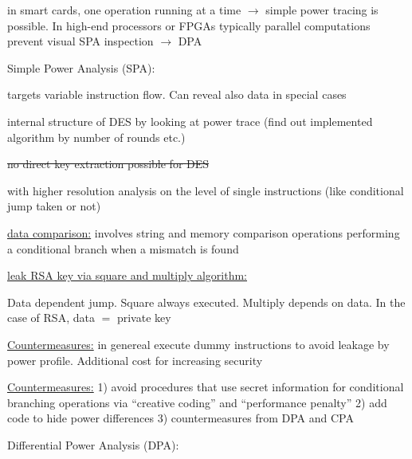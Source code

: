 \documentclass[landscape, a4paper]{article}
\begin{document}
\begin{minipage}[t]{0.2\linewidth}
\end{minipage}
\begin{minipage}[t]{0.2\linewidth}
	\begin{betterlist}
		\item in \alert{smart cards}, one operation running at a time $\rightarrow$ simple power tracing is possible. In \alert{high-end processors} or \alert{FPGAs} typically parallel computations prevent visual SPA inspection $\rightarrow$ DPA
		\item \alert{Simple Power Analysis (SPA):}
		\begin{betterlist}
			\item targets variable instruction flow. Can reveal also data in special cases
			\item internal structure of \alert{DES} by looking at power trace (find out implemented algorithm by number of rounds etc.)
			\begin{betterlist}
				\item \sout{no direct key extraction possible for \alert{DES}}
			\end{betterlist}
			\item with higher resolution analysis on the level of single instructions (like conditional jump taken or not)
			\item \underline{data comparison:} involves string and memory comparison operations performing a conditional branch when a mismatch is found
			\item \underline{leak RSA key via square and multiply algorithm:}
			\begin{betterlist}
				\item Data dependent jump. Square always executed. Multiply depends on data. In the case of RSA, data $=$ private key
				\item \underline{Countermeasures:} in genereal execute dummy instructions to avoid leakage by power profile. Additional cost for increasing security
			\end{betterlist}
			\item \underline{Countermeasures:} \alert{1)} avoid procedures that use secret information for conditional branching operations via \enquote{creative coding} and \enquote{performance penalty} \alert{2)} add code to hide power differences \alert{3)} countermeasures from DPA and CPA
		\end{betterlist}
		\item \alert{Differential Power Analysis (DPA):}

\end{betterlist}
\end{minipage}
\end{document}
